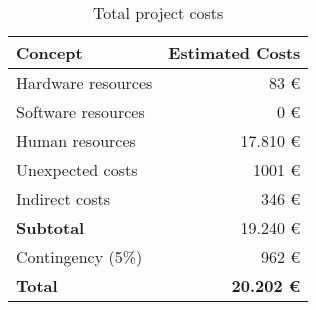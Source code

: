 
\begin{frame}{}
  \begin{table}[H]
    \centering
    \begin{tabular}{|l|r|}
      \hline
      \textbf{Concept} & \textbf{Estimated Costs} \\ \hline\hline
  
      Hardware resources & 83 \euro \\ \hline
      Software resources & 0 \euro \\ \hline
      Human resources & 17.810 \euro \\ \hline
      Unexpected costs & 1001 \euro \\ \hline
      Indirect costs & 346 \euro \\ \hline
  
      \hline\hline
      \textbf{Subtotal} & 19.240 \euro \\
      \hline\hline
      Contingency (5\%) & 962 \euro \\
      \hline\hline
      \textbf{Total} & \textbf{20.202 \euro} \\ \hline
    \end{tabular}
  
    \caption{Total project costs \label{tab:total-costs}}
  \end{table}
\end{frame}


